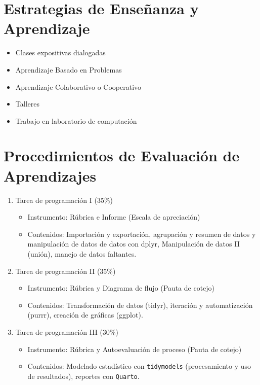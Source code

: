 \documentclass[11pt,letter,]{article}
\providecommand{\tightlist}{%
  \setlength{\itemsep}{0pt}\setlength{\parskip}{0pt}}
\begin{document}
\hypertarget{estrategias-de-enseuxf1anza-y-aprendizaje}{%
\section{Estrategias de Enseñanza y
Aprendizaje}\label{estrategias-de-enseuxf1anza-y-aprendizaje}}

\begin{itemize}
\tightlist
\item
  Clases expositivas dialogadas
\item
  Aprendizaje Basado en Problemas
\item
  Aprendizaje Colaborativo o Cooperativo
\item
  Talleres
\item
  Trabajo en laboratorio de computación
\end{itemize}

\hypertarget{procedimientos-de-evaluaciuxf3n-de-aprendizajes}{%
\section{Procedimientos de Evaluación de
Aprendizajes}\label{procedimientos-de-evaluaciuxf3n-de-aprendizajes}}

\begin{enumerate}
\def\labelenumi{\arabic{enumi}.}
\tightlist
\item
  Tarea de programación I (35\%)

  \begin{itemize}
  \tightlist
  \item
    Instrumento: Rúbrica e Informe (Escala de apreciación)
  \item
    Contenidos: Importación y exportación, agrupación y resumen de datos
    y manipulación de datos de datos con dplyr, Manipulación de datos II
    (unión), manejo de datos faltantes.
  \end{itemize}
\item
  Tarea de programación II (35\%)

  \begin{itemize}
  \tightlist
  \item
    Instrumento: Rúbrica y Diagrama de flujo (Pauta de cotejo)
  \item
    Contenidos: Transformación de datos (tidyr), iteración y
    automatización (purrr), creación de gráficas (ggplot).
  \end{itemize}
\item
  Tarea de programación III (30\%)

  \begin{itemize}
  \tightlist
  \item
    Instrumento: Rúbrica y Autoevaluación de proceso (Pauta de cotejo)
  \item
    Contenidos: Modelado estadístico con \texttt{tidymodels}
    (procesamiento y uso de resultados), reportes con \texttt{Quarto}.
  \end{itemize}
\end{enumerate}
\end{document}
